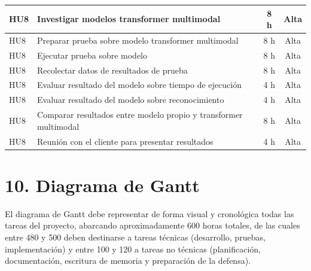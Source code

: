 \documentclass[
11pt, %
]{charter}
\begin{document}
\begin{table}[H]
\begin{tabularx}{\linewidth}{@{}|l|X|c|c|@{}}
HU8 & Investigar modelos transformer multimodal & 8 h & Alta \\ \hline
HU8 & Preparar prueba sobre modelo transformer multimodal & 8 h & Alta \\ \hline

HU8 & Ejecutar prueba sobre modelo & 8 h & Alta \\ \hline
HU8 & Recolectar datos de resultados de prueba & 8 h & Alta \\ \hline

HU8 & Evaluar resultado del modelo sobre tiempo de ejecución & 4 h & Alta \\ \hline
HU8 & Evaluar resultado del modelo sobre reconocimiento & 4 h & Alta \\ \hline
HU8 & Comparar resultados entre modelo propio y transformer multimodal & 8 h & Alta \\ \hline
HU8 & Reunión con el cliente para presentar resultados & 4 h & Alta \\ \hline

\end{tabularx}
\end{table}

\newpage
\section{10. Diagrama de Gantt}
\label{sec:gantt}

El diagrama de Gantt debe representar de forma visual y cronológica todas las tareas del proyecto, abarcando aproximadamente 600 horas totales, de las cuales entre 480 y 500 deben destinarse a tareas técnicas (desarrollo, pruebas, implementación) y entre 100 y 120 a tareas no técnicas (planificación, documentación, escritura de memoria y preparación de la defensa).
\end{document}
